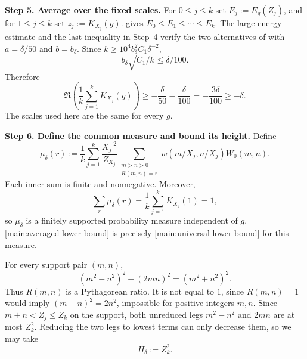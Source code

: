 \documentclass[twoside]{aomart}
\makeatletter
\theoremstyle{paperplain}
\theoremstyle{paperdefinition}
\renewenvironment{proof}[1][\proofname]{\par\pushQED{\qed}%
  \normalfont\topsep6\p@\@plus3\p@\relax\trivlist
  \item[\hskip\labelsep\itshape #1\@addpunct{.}]\ignorespaces
}{\popQED\endtrivlist\@endpefalse}
\newcommand{\R}{\mathbb R}
\numberwithin{equation}{section}
\makeatother
\begin{document}
\begin{proof}
\par
\medskip
\noindent\textbf{Step 5. Average over the fixed scales.}
For $0\le j\le k$ set $E_j:=E_g(Z_j)$, and for $1\le j\le k$ set
$z_j:=K_{X_j}(g)$.   gives
$E_0\le E_1\le\cdots\le E_k$.  The large-energy estimate and the last
inequality in Step~4 verify the two alternatives of
 with $a=\delta/50$ and $b=b_\delta$.
Since $k\ge10^4b_\delta^2C_1\delta^{-2}$,
\[
 b_\delta\sqrt{C_1/k}\le\delta/100.
\]
Therefore
\begin{equation}
 \Re\left(\frac1k\sum_{j=1}^kK_{X_j}(g)\right)
 \ge-\frac{\delta}{50}-\frac{\delta}{100}
 =-\frac{3\delta}{100}\ge-\delta.
 \label{main:averaged-lower-bound}
\end{equation}
The scales used here are the same for every $g$.

\par
\medskip
\noindent\textbf{Step 6. Define the common measure and bound its height.}
Define
\begin{equation*}
\mu_\delta(r):=\frac1k\sum_{j=1}^k
   \frac{X_j^{-2}}{Z_{X_j}}
   \sum_{\substack{m>n>0\\R(m,n)=r}}
      w(m/X_j,n/X_j)W_0(m,n).
\end{equation*}
Each inner sum is finite and nonnegative.  Moreover,
\[
 \sum_r\mu_\delta(r)=\frac1k\sum_{j=1}^kK_{X_j}(1)=1,
\]
so $\mu_\delta$ is a finitely supported probability measure independent
of $g$.  \eqref{main:averaged-lower-bound} is precisely
\eqref{main:universal-lower-bound} for this measure.

For every support pair $(m,n)$,
\[
 (m^2-n^2)^2+(2mn)^2=(m^2+n^2)^2.
\]
Thus $R(m,n)$ is a Pythagorean ratio.  It is not equal to $1$, since
$R(m,n)=1$ would imply $(m-n)^2=2n^2$, impossible for positive integers
$m,n$.  Since $m+n<Z_j\le Z_k$ on the support, both unreduced legs
$m^2-n^2$ and $2mn$ are at most $Z_k^2$.  Reducing the two legs to lowest
terms can only decrease them, so we may take
\[
 H_\delta:=Z_k^2.
\]


\end{proof}
\end{document}
